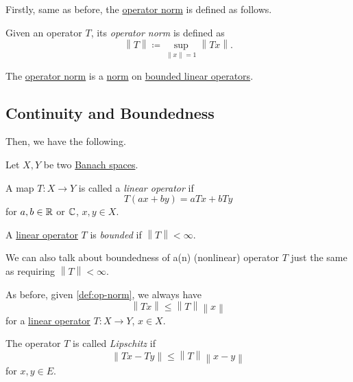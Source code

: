 Firstly, same as before, the \hyperref[def:op-norm]{operator norm} is defined as follows.

\begin{definition}\label{def:op-norm}
	Given an operator \(T\), its \emph{operator norm} is defined as
	\[
		\left\lVert T\right\rVert \coloneqq \sup _{\left\lVert x\right\rVert = 1} \left\lVert Tx\right\rVert.
	\]
\end{definition}

\begin{remark}
	The \hyperref[def:op-norm]{operator norm} is a \hyperref[def:norm]{norm} on \hyperref[def:bounded-linear-op]{bounded linear operators}.
\end{remark}

\subsection{Continuity and Boundedness}
Then, we have the following.
\begin{definition*}
	Let \(X, Y\) be two \hyperref[def:Banach-space]{Banach spaces}.
	\begin{definition}\label{def:linear-op}
		A map \(T\colon X\to Y\) is called a \emph{linear operator} if
		\[
			T(ax + by) = aTx + bTy
		\]
		for \(a, b\in \mathbb{\MakeUppercase{r}} \) or \(\mathbb{\MakeUppercase{c}} \), \(x, y\in X\).
	\end{definition}
	\begin{definition}\label{def:bounded-linear-op}
		A \hyperref[def:linear-op]{linear operator} \(T\) is \emph{bounded} if \(\left\lVert T\right\rVert < \infty \).
	\end{definition}
\end{definition*}

\begin{remark}\label{rmk:bounded-op}
	We can also talk about boundedness of a(n) (nonlinear) operator \(T\) just the same as requiring \(\left\lVert T\right\rVert < \infty \).
\end{remark}

As before, given \autoref{def:op-norm}, we always have
\[
	\left\lVert Tx\right\rVert \leq \left\lVert T\right\rVert \left\lVert x\right\rVert
\]
for a \hyperref[def:linear-op]{linear operator} \(T\colon X\to Y\), \(x\in X\).

\begin{definition}[Lipschitz]\label{def:Lipschitz}
	The operator \(T\) is called \emph{Lipschitz} if
	\[
		\left\lVert Tx - Ty\right\rVert \leq \left\lVert T\right\rVert \left\lVert x - y\right\rVert
	\]
	for \(x, y\in E\).
\end{definition}

